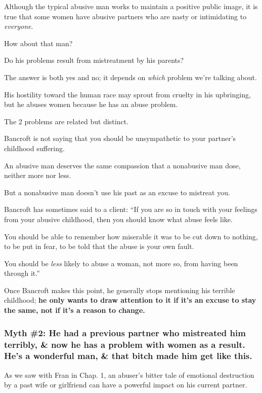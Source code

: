 \documentclass[oneside]{article}
\numberwithin{equation}{section}
\begin{document}
%
Although the typical abusive man works to maintain a positive public image, it is true that some women have abusive partners who are nasty or intimidating to \textit{everyone}.

How about that man?

Do his problems result from mistreatment by his parents?

The answer is both yes and no; it depends on \textit{which} problem we're talking about.

His hostility toward the human race may sprout from cruelty in his upbringing, but he abuses women because he has an abuse problem.

The 2 problems are related but distinct.

%
Bancroft is not saying that you should be unsympathetic to your partner's childhood suffering.

An abusive man deserves the same compassion that a nonabusive man dose, neither more nor less.

But a nonabusive man doesn't use his past as an excuse to mistreat you.


%
Bancroft has sometimes said to a client: ``If you are so in touch with your feelings from your abusive childhood, then you should know what abuse feels like.

You should be able to remember how miserable it was to be cut down to nothing, to be put in fear, to be told that the abuse is your own fault.

You should be \textit{less} likely to abuse a woman, not more so, from having been through it.''

Once Bancroft makes this point, he generally stops mentioning his terrible childhood; \textbf{he only wants to draw attention to it if it's an excuse to stay the same, not if it's a reason to change.}

\subsubsection{Myth \#2: He had a previous partner who mistreated him terribly, \& now he has a problem with women as a result. He's a wonderful man, \& that bitch made him get like this.}
As we saw with Fran in Chap. 1, an abuser's bitter tale of emotional destruction by a past wife or girlfriend can have a powerful impact on his current partner.
\end{document}
